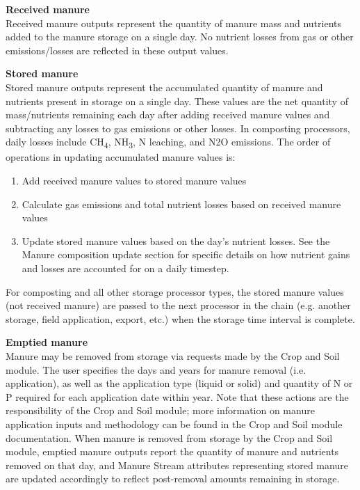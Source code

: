 \begin{refsection}
\textbf{Received manure}\\
\vspace{ 0.25cm}
Received manure outputs represent the quantity of manure mass and nutrients added to the manure storage on a single day. No nutrient losses from gas or other emissions/losses are reflected in these output values. \\
\vspace{ 0.25cm}

\textbf{Stored manure}\\
Stored manure outputs represent the accumulated quantity of manure and nutrients present in storage on a single day. These values are the net quantity of mass/nutrients remaining each day after adding received manure values and subtracting any losses to gas emissions or other losses. In composting processors, daily losses include CH\textsubscript{4}, NH\textsubscript{3}, N leaching, and N2O emissions. The order of operations in updating accumulated manure values is: 
        \begin{enumerate}
            \item Add received manure values to stored manure values
            \item Calculate gas emissions and total nutrient losses based on received manure values
            \item Update stored manure values based on the day’s nutrient losses. See the Manure composition update section for specific details on how nutrient gains and losses are accounted for on a daily timestep. 
        \end{enumerate}


For composting and all other storage processor types, the stored manure values (not received manure) are passed to the next processor in the chain (e.g. another storage, field application, export, etc.) when the storage time interval is complete. 

\vspace{0.2cm}
\textbf{Emptied manure}\\
Manure may be removed from storage via requests made by the Crop and Soil module. The user specifies the days and years for manure removal (i.e. application), as well as the application type (liquid or solid) and quantity of N or P required for each application date within year. Note that these actions are the responsibility of the Crop and Soil module; more information on manure application inputs and methodology can be found in the Crop and Soil module documentation. When manure is removed from storage by the Crop and Soil module, emptied manure outputs report the quantity of manure and nutrients removed on that day, and Manure Stream attributes representing stored manure are updated accordingly to reflect post-removal amounts remaining in storage.


\end{refsection}
